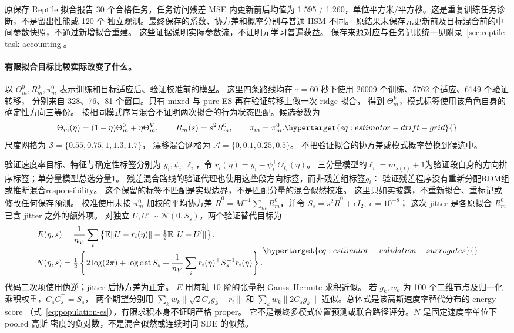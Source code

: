 原保存 Reptile 拟合报告 30 个合格任务，任务访问残差 MSE 内更新前后均值为
1.595 / 1.260，单位平方米/平方秒。这是重复训练任务诊断，不是留出性能或 120 个
独立观测。最终保存的系数、协方差和概率分别与普通 HSM 不同。
原结果未保存元更新前及目标混合前的中间参数快照，不通过新增拟合重建。
这些证据说明实际参数流，不证明元学习普遍获益。
保存来源对应与任务记账统一见附录~\ref{sec:reptile-task-accounting}。

\paragraph{有限拟合目标比较实际改变了什么。}
\label{sec:estimator-calibration}\hypertarget{sec:estimator-calibration}{}
以 \(\Theta_m^0,R_m^0,\pi_m^0\) 表示训练和目标适应后、验证校准前的模型。
这里四条路线均在 \(\tau=60\) 秒下使用 26009 个训练、5762 个适应、6149 个验证转移，
分别来自 328、76、81 个窗口。只有 mixed 与 pure-ES 再在验证转移上做一次 ridge 拟合，
得到 \(\Theta_m^V\)，模式标签使用该角色自身的确定性方向三等份。
按相同模式序号混合不证明两次拟合的行为状态匹配。候选参数为
\begin{equation}
\Theta_m(\eta)=(1-\eta)\Theta_m^0+\eta\Theta_m^V,\qquad
R_m(s)=s^2R_m^0,\qquad \pi_m=\pi_m^0 .
\label{eq:estimator-drift-grid}\hypertarget{eq:estimator-drift-grid}{}
\end{equation}
尺度网格为 \(\mathcal S=\{0.55,0.75,1,1.3,1.7\}\)，
漂移混合网格为 \(\mathcal A=\{0,0.1,0.25,0.5\}\)。
不把验证拟合的协方差或模式概率替换到候选中。

验证速度率目标、特征与确定性标签分别为 \(y_i,\psi_i,\ell_i\)，令
\(r_i(\eta)=y_i-\psi_i^\top\Theta_{\ell_i}(\eta)\)。
三分量模型的\(\ell_i=m_{s(i)}+1\)为验证段自身的方向排序标签；单分量模型总选分量1。
残差混合路线的验证代理也使用这些段方向标签，而非残差组标签\(g_i\)：
验证残差程序没有重新分配RDM组或推断混合responsibility。
这个保留的标签不匹配是实现边界，不是匹配分量的混合似然校准。
这里只如实披露，不重新拟合、重标记或修改任何保存预测。
校准使用未按 \(\pi_m^0\) 加权的平均协方差
\(\overline R^0=M^{-1}\sum_mR_m^0\)，并令
\(S_s=s^2\overline R^0+\epsilon I_2,\ \epsilon=10^{-8}\)；
这次 jitter 是各原拟合 \(R_m^0\) 已含 jitter 之外的额外项。
对独立 \(U,U'\sim\mathcal N(0,S_s)\)，两个验证替代目标为
\begin{equation}
\begin{aligned}
E(\eta,s)&=\frac1{n_V}\sum_i
 \left\{\mathbb E\|U-r_i(\eta)\|-\tfrac12\mathbb E\|U-U'\|\right\},\\
N(\eta,s)&=\tfrac12\left\{2\log(2\pi)+\log\det S_s
 +\frac1{n_V}\sum_i r_i(\eta)^\top S_s^{-1}r_i(\eta)\right\}.
\end{aligned}
\label{eq:estimator-validation-surrogates}\hypertarget{eq:estimator-validation-surrogates}{}
\end{equation}
代码二次项使用伪逆；jitter 后协方差为正定。
\(E\) 用每轴 10 阶的张量积 Gauss--Hermite 求积近似。
若 \(g_k,w_k\) 为 100 个二维节点及归一化乘积权重，\(C_sC_s^\top=S_s\)，
两个期望分别用 \(\sum_kw_k\|\sqrt2C_sg_k-r_i\|\) 和
\(\sum_kw_k\|2C_sg_k\|\) 近似。总体式是该高斯速度率替代分布的 energy score
（式~\eqref{eq:population-es}），有限求积本身不证明严格 proper。
它不是最终多模式位置预测或联合路径评分。\(N\) 是固定速度率单位下 pooled 高斯
密度的负对数，不是混合似然或连续时间 SDE 的似然。

